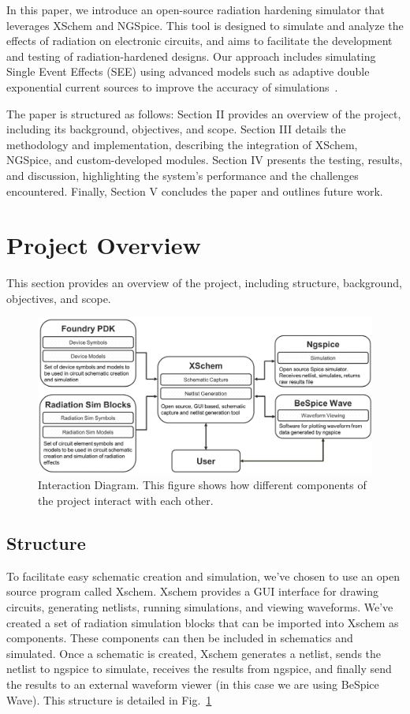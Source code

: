 \documentclass[conference]{IEEEtran}
\begin{document}
    In this paper, we introduce an open-source radiation hardening simulator that leverages XSchem and NGSpice.
    This tool is designed to simulate and analyze the effects of radiation on electronic circuits, and aims to facilitate the development and testing of radiation-hardened designs.
    Our approach includes simulating Single Event Effects (SEE) using advanced models such as adaptive double exponential current sources to improve the accuracy of simulations~\cite{Pepper1990}.

    The paper is structured as follows: Section II provides an overview of the project, including its background, objectives, and scope.
    Section III details the methodology and implementation, describing the integration of XSchem, NGSpice, and custom-developed modules.
    Section IV presents the testing, results, and discussion, highlighting the system's performance and the challenges encountered.
    Finally, Section V concludes the paper and outlines future work.


    \section{Project Overview}\label{sec:project-overview}
    This section provides an overview of the project, including structure, background, objectives, and scope.
    
    \begin{figure}[htbp]
        \centering
        \includegraphics[width=0.95\linewidth]{Block_Diagram_B_W_cropped}
        \caption{Interaction Diagram. This figure shows how different components of the project interact with each other.}
        \label{fig:interaction_diagram}
    \end{figure}
    
    \subsection{Structure}\label{subsec:project-structure}
    To facilitate easy schematic creation and simulation, we've chosen to use an open source program called Xschem. Xschem provides a GUI interface for drawing circuits, generating netlists, running simulations, and viewing waveforms. We've created a set of radiation simulation blocks that can be imported into Xschem as components. These components can then be included in schematics and simulated. Once a schematic is created, Xschem generates a netlist, sends the netlist to ngspice to simulate, receives the results from ngspice, and finally send the results to an external waveform viewer (in this case we are using BeSpice Wave). This structure is detailed in Fig.~\ref{fig:interaction_diagram}
    
\end{document}
